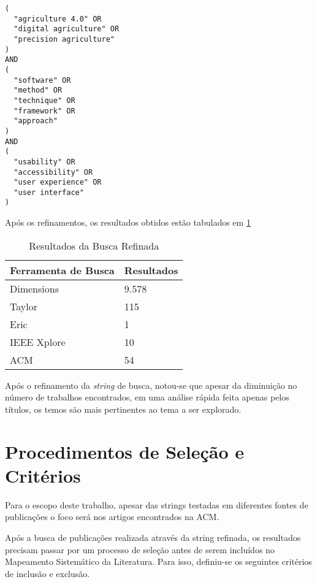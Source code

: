 \documentclass[12pt]{article}
\begin{document}
\begin{lstlisting}[caption={String de Busca Gerada},captionpos=b,frame=single,label={code:string_de_busca_refinada}]
(
  "agriculture 4.0" OR
  "digital agriculture" OR 
  "precision agriculture"
)
AND
(
  "software" OR
  "method" OR
  "technique" OR
  "framework" OR
  "approach"
)
AND
(
  "usability" OR
  "accessibility" OR
  "user experience" OR
  "user interface"
)
\end{lstlisting}

Após os refinamentos, os resultados obtidos estão tabulados em \ref{tab:resultados_busca_refinada}

\begin{table}[!htb]
  \centering
	\begin{tabular}{|l|l|}
		\hline
		\textbf{Ferramenta de Busca} & \textbf{Resultados} \\ \hline
		Dimensions                   & 9.578               \\ \hline
		Taylor                       & 115                 \\ \hline
		Eric                         & 1                   \\ \hline
		IEEE Xplore                  & 10                  \\ \hline
		ACM                          & 54                  \\ \hline
		\end{tabular}
  \caption{Resultados da Busca Refinada}
  \label{tab:resultados_busca_refinada}
\end{table}

Após o refinamento da \textit{string} de busca, notou-se que apesar da diminuição no número de trabalhos encontrados, em uma análise rápida feita apenas pelos títulos, os temos são mais pertinentes ao tema a ser explorado.

\section{Procedimentos de Seleção e Critérios}

Para o escopo deste trabalho, apesar das strings testadas em diferentes fontes de publicações o foco será nos artigos encontrados na ACM.

Após a busca de publicações realizada através da string refinada, os resultados precisam passar por um processo de seleção antes de serem incluídos no Mapeamento Sistemático da Literatura. Para isso, definiu-se os seguintes critérios de inclusão e exclusão.
\end{document}
